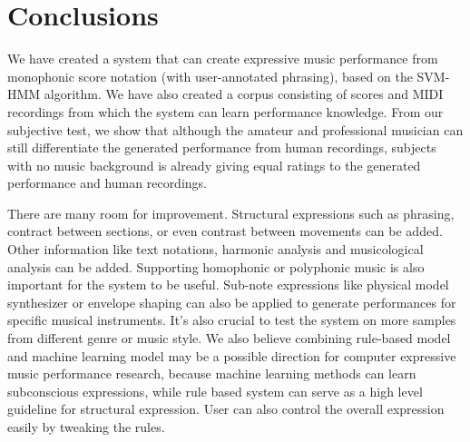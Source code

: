 \chapter{Conclusions}
We have created a system that can create expressive music performance from monophonic score notation (with user-annotated phrasing), based on the SVM-HMM algorithm. We have also created a corpus consisting of scores and MIDI recordings from which the system can learn performance knowledge. From our subjective test, we show that although the amateur and professional musician can still differentiate the generated performance from human recordings, subjects with no music background is already giving equal ratings to the generated performance and human recordings.

There are many room for improvement. Structural expressions such as phrasing, contract between sections, or even contrast between movements can be added. Other information like text notations, harmonic analysis and musicological analysis can be added. Supporting homophonic or polyphonic music is also important for the system to be useful. Sub-note expressions like physical model synthesizer or envelope shaping can also be applied to generate performances for specific musical instruments. It's also crucial to test the system on more samples from different genre or music style. We also believe combining rule-based model and machine learning model may be a possible direction for computer expressive music performance research, because machine learning methods can learn subconscious expressions, while rule based system can serve as a high level guideline for structural expression. User can also control the overall expression easily by tweaking the rules.


